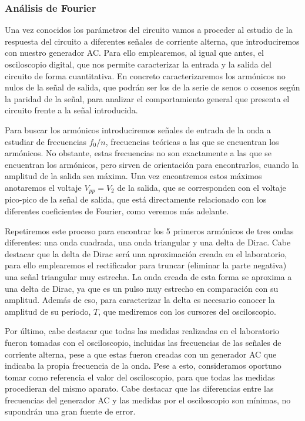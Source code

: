 \documentclass[a4paper,12pt,titlepage]{article}
\begin{document}
\subsubsection{Análisis de Fourier}

Una vez conocidos los parámetros del circuito vamos a proceder al estudio de la respuesta del circuito a diferentes señales de corriente alterna, que introduciremos con nuestro generador AC. Para ello emplearemos, al igual que antes, el osciloscopio digital, que nos permite caracterizar la entrada y la salida del circuito de forma cuantitativa. En concreto caracterizaremos los armónicos no nulos de la señal de salida, que podrán ser los de la serie de senos o cosenos según la paridad de la señal, para analizar el comportamiento general que presenta el circuito frente a la señal introducida. 

Para buscar los armónicos introduciremos señales de entrada de la onda a estudiar de frecuencias $f_0/n$, frecuencias teóricas a las que se encuentran los armónicos. No obstante, estas frecuencias no son exactamente a las que se encuentran los armónicos, pero sirven de orientación para encontrarlos, cuando la amplitud de la salida sea máxima. Una vez encontremos estos máximos anotaremos el voltaje $V_{pp}=V_2$ de la salida, que se corresponden con el voltaje pico-pico de la señal de salida, que está directamente relacionado con los diferentes coeficientes de Fourier, como veremos más adelante.

Repetiremos este proceso para encontrar los 5 primeros armónicos de tres ondas diferentes: una onda cuadrada, una onda triangular y una delta de Dirac. Cabe destacar que la delta de Dirac será una aproximación creada en el laboratorio, para ello emplearemos el rectificador para truncar (eliminar la parte negativa) una señal triangular muy estrecha. La onda creada de esta forma se aproxima a una delta de Dirac, ya que es un pulso muy estrecho en comparación con su amplitud. Además de eso, para caracterizar la delta es necesario conocer la amplitud de su período, $T$, que mediremos con los cursores del osciloscopio.

Por último, cabe destacar que todas las medidas realizadas en el laboratorio fueron tomadas con el osciloscopio, incluidas las frecuencias de las señales de corriente alterna, pese a que estas fueron creadas con un generador AC que indicaba la propia frecuencia de la onda. Pese a esto, consideramos oportuno tomar como referencia el valor del osciloscopio, para que todas las medidas procedieran del mismo aparato. Cabe destacar que las diferencias entre las frecuencias del generador AC y las medidas por el osciloscopio son mínimas, no supondrán una gran fuente de error.
\end{document}
